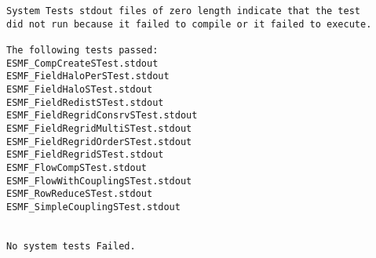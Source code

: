\begin{verbatim}
System Tests stdout files of zero length indicate that the test
did not run because it failed to compile or it failed to execute. 

The following tests passed: 
ESMF_CompCreateSTest.stdout
ESMF_FieldHaloPerSTest.stdout
ESMF_FieldHaloSTest.stdout
ESMF_FieldRedistSTest.stdout
ESMF_FieldRegridConsrvSTest.stdout
ESMF_FieldRegridMultiSTest.stdout
ESMF_FieldRegridOrderSTest.stdout
ESMF_FieldRegridSTest.stdout
ESMF_FlowCompSTest.stdout
ESMF_FlowWithCouplingSTest.stdout
ESMF_RowReduceSTest.stdout
ESMF_SimpleCouplingSTest.stdout


No system tests Failed.

\end{verbatim}

